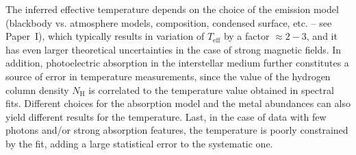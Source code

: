 \documentclass[smallextended]{svjour3}       %
\newcommand{\Teff}{T_\mathrm{eff}}
\begin{document}
The inferred effective temperature depends on the choice
of the emission model (blackbody vs. atmosphere models, composition,
condensed surface, etc. -- see Paper~I), which typically results in
variation of $\Teff$ by a factor $\approx 2-3$, and it has even larger
theoretical uncertainties in the case of strong magnetic fields.  In addition, photoelectric
absorption in the interstellar medium further constitutes a source of
error in temperature measurements, since the value of the hydrogen
column density $N_\mathrm{H}$ is correlated to the temperature value obtained
in spectral fits. Different choices for the absorption model and the
metal abundances can also yield different results for the temperature.
Last, in the case of data with few photons and/or strong absorption features,
the temperature is poorly constrained by the fit, adding a large
statistical error to the systematic one.
\end{document}
